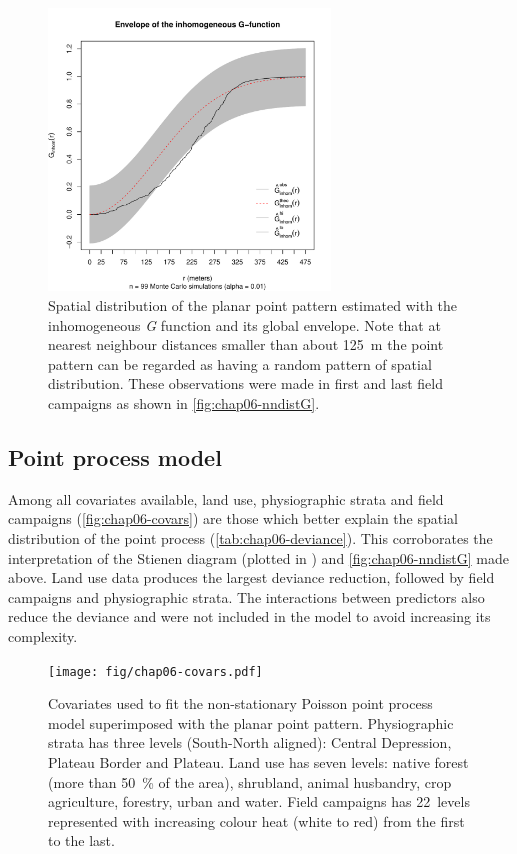 \begin{figure}[!ht]
 \centering
 \includegraphics[trim=0mm 0mm 0mm 12mm,clip=true,width=7.5cm]{fig/chap06-gest-sim.pdf}
 \caption{Spatial distribution of the planar point pattern estimated with the inhomogeneous \emph{G} function 
 and its global envelope. Note that at nearest neighbour distances smaller than about \SI{125}{\m} the point 
 pattern can be regarded as having a random pattern of spatial distribution. These observations were made in 
 first and last field campaigns as shown in \autoref{fig:chap06-nndistG}.}
\label{fig:chap06-gest}
\end{figure}

\subsection{Point process model}

Among all covariates available, land use, physiographic strata and field campaigns 
(\autoref{fig:chap06-covars}) are those which better explain the spatial distribution of the point process 
(\autoref{tab:chap06-deviance}). This corroborates the interpretation of the Stienen diagram (plotted in 
\googleearth) and \autoref{fig:chap06-nndistG} made above. Land use data produces the largest deviance 
reduction, followed by field campaigns and physiographic strata. The interactions between predictors also 
reduce the deviance and were not included in the model to avoid increasing its complexity.

\begin{figure}[!h]
 \centering
 \texttt{[image: fig/chap06-covars.pdf]}
 \caption{Covariates used to fit the non-stationary Poisson point process model superimposed with the planar 
 point pattern. Physiographic strata has three levels (South-North aligned): Central Depression, Plateau 
 Border and Plateau. Land use has seven levels: native forest (more than \SI{50}{\percent} of the area), 
 shrubland, animal husbandry, crop agriculture, forestry, urban and water. Field campaigns has \num{22}~levels 
 represented with increasing colour heat (white to red) from the first to the last.}
 \label{fig:chap06-covars}
\end{figure}

